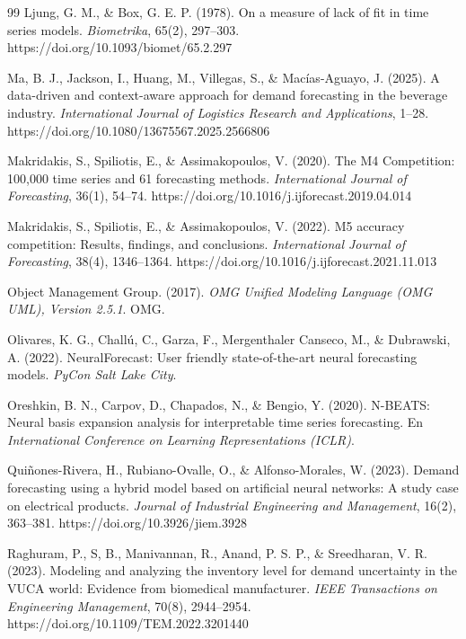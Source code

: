 \begin{thebibliography}{99}
 Ljung, G. M., \& Box, G. E. P. (1978). On a measure of lack of fit in time series models. \textit{Biometrika}, 65(2), 297--303. https://doi.org/10.1093/biomet/65.2.297

 Ma, B. J., Jackson, I., Huang, M., Villegas, S., \& Macías-Aguayo, J. (2025). A data-driven and context-aware approach for demand forecasting in the beverage industry. \textit{International Journal of Logistics Research and Applications}, 1--28. https://doi.org/10.1080/13675567.2025.2566806

 Makridakis, S., Spiliotis, E., \& Assimakopoulos, V. (2020). The M4 Competition: 100,000 time series and 61 forecasting methods. \textit{International Journal of Forecasting}, 36(1), 54--74. https://doi.org/10.1016/j.ijforecast.2019.04.014

 Makridakis, S., Spiliotis, E., \& Assimakopoulos, V. (2022). M5 accuracy competition: Results, findings, and conclusions. \textit{International Journal of Forecasting}, 38(4), 1346--1364. https://doi.org/10.1016/j.ijforecast.2021.11.013

 Object Management Group. (2017). \textit{OMG Unified Modeling Language (OMG UML), Version 2.5.1}. OMG.

 Olivares, K. G., Challú, C., Garza, F., Mergenthaler Canseco, M., \& Dubrawski, A. (2022). NeuralForecast: User friendly state-of-the-art neural forecasting models. \textit{PyCon Salt Lake City}.

 Oreshkin, B. N., Carpov, D., Chapados, N., \& Bengio, Y. (2020). N-BEATS: Neural basis expansion analysis for interpretable time series forecasting. En \textit{International Conference on Learning Representations (ICLR)}.

 Quiñones-Rivera, H., Rubiano-Ovalle, O., \& Alfonso-Morales, W. (2023). Demand forecasting using a hybrid model based on artificial neural networks: A study case on electrical products. \textit{Journal of Industrial Engineering and Management}, 16(2), 363--381. https://doi.org/10.3926/jiem.3928

 Raghuram, P., S, B., Manivannan, R., Anand, P. S. P., \& Sreedharan, V. R. (2023). Modeling and analyzing the inventory level for demand uncertainty in the VUCA world: Evidence from biomedical manufacturer. \textit{IEEE Transactions on Engineering Management}, 70(8), 2944--2954. https://doi.org/10.1109/TEM.2022.3201440


\end{thebibliography}
